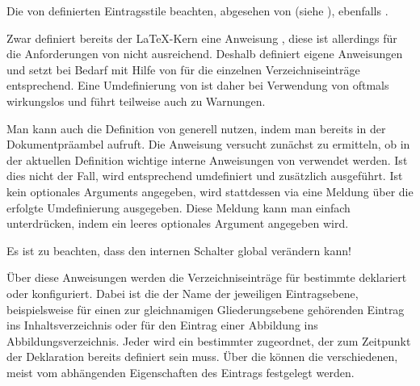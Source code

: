 Die von  definierten Eintragsstile beachten, abgesehen von
 (siehe
), ebenfalls .%
\EndIndexGroup


\begin{Declaration}
\end{Declaration}
Zwar definiert bereits der
\LaTeX-Kern eine Anweisung , diese ist allerdings für die
Anforderungen von  nicht ausreichend. Deshalb definiert
 eigene Anweisungen und setzt  bei Bedarf
mit Hilfe von  für die einzelnen
Verzeichniseinträge entsprechend. Eine Umdefinierung von 
ist daher bei Verwendung von  oftmals wirkungslos und führt
teilweise auch zu Warnungen.

Man kann auch die Definition von  generell nutzen, indem man
bereits in der Dokumentpräambel  aufruft. Die
Anweisung versucht zunächst zu ermitteln, ob in der aktuellen Definition
wichtige interne Anweisungen von  verwendet werden. Ist dies
nicht der Fall, wird  entsprechend umdefiniert und zusätzlich
 ausgeführt. Ist kein optionales Arguments angegeben, wird
stattdessen via  eine Meldung über die erfolgte
Umdefinierung ausgegeben. Diese Meldung kann man einfach unterdrücken, indem
ein leeres optionales Argument angegeben wird.

Es ist zu beachten, dass  den
internen Schalter  global verändern kann!%
\EndIndexGroup


\begin{Declaration}
\end{Declaration}
Über diese Anweisungen werden
die Verzeichniseinträge für bestimmte  deklariert
oder konfiguriert. Dabei ist die  der Name der jeweiligen
Eintragsebene, beispielsweise  für einen zur gleichnamigen
Gliederungsebene gehörenden Eintrag ins Inhaltsverzeichnis oder
 für den Eintrag einer Abbildung ins
Abbildungsverzeichnis. Jeder  wird ein bestimmter
 zugeordnet, der zum Zeitpunkt der Deklaration bereits definiert
sein muss. Über die  können die verschiedenen, meist vom
 abhängenden Eigenschaften des Eintrags festgelegt werden.

